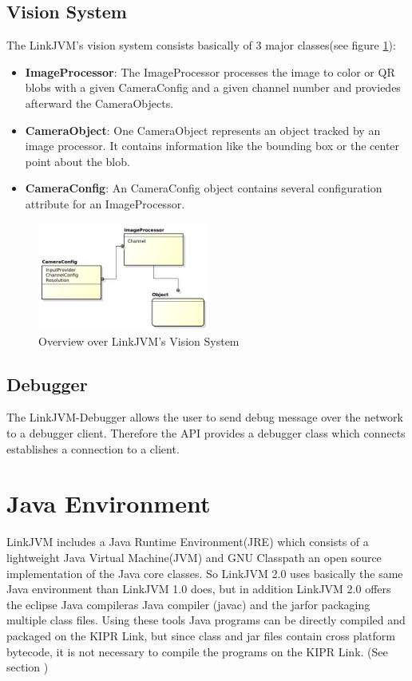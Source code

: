 \documentclass{juniorjournal}
\begin{document}
\subsection{Vision System}
The LinkJVM's vision system consists basically of 3 major classes(see figure \ref{fig:Vision-System}):
\begin{itemize}
	\item {\bf ImageProcessor}: The ImageProcessor processes the image to color or QR blobs with a given CameraConfig and a given channel number and proviedes afterward the CameraObjects. 
	\item {\bf CameraObject}: One CameraObject represents an object tracked by an image processor. It contains information like the bounding box or the center point about the blob.
	\item {\bf CameraConfig}: An CameraConfig object contains several configuration attribute for an ImageProcessor.
\end{itemize}
\begin{figure}[H]
\centering
\includegraphics[width=0.5\textwidth]{images/vision.pdf}
\caption{Overview over LinkJVM's Vision System}
\label{fig:Vision-System}
\end{figure}


\subsection{Debugger}
The LinkJVM-Debugger allows the user to send debug message over the network to a debugger client.
Therefore the API provides a debugger class which connects establishes a connection to a client.


\section{Java Environment}
LinkJVM includes a Java\cite{Java} Runtime Environment(JRE\cite{JRE}) which consists of a lightweight Java\cite{Java} Virtual Machine(JVM\cite{JVM}) and GNU Classpath\cite{GNU} an open source implementation of the Java\cite{Java} core classes.
So LinkJVM 2.0 uses basically the same Java\cite{Java} environment than LinkJVM 1.0\cite{linkjvm1.0} does, but in addition LinkJVM 2.0 offers the \frqq eclipse Java\cite{Java} compiler\flqq  as Java compiler (javac) and the \frqq jar\flqq  for packaging multiple class files.
Using these tools Java\cite{Java} programs can be directly compiled and packaged on the KIPR Link, but since class and jar files contain cross platform bytecode, it is not necessary to compile the programs on the KIPR Link. (See section )
\end{document}

